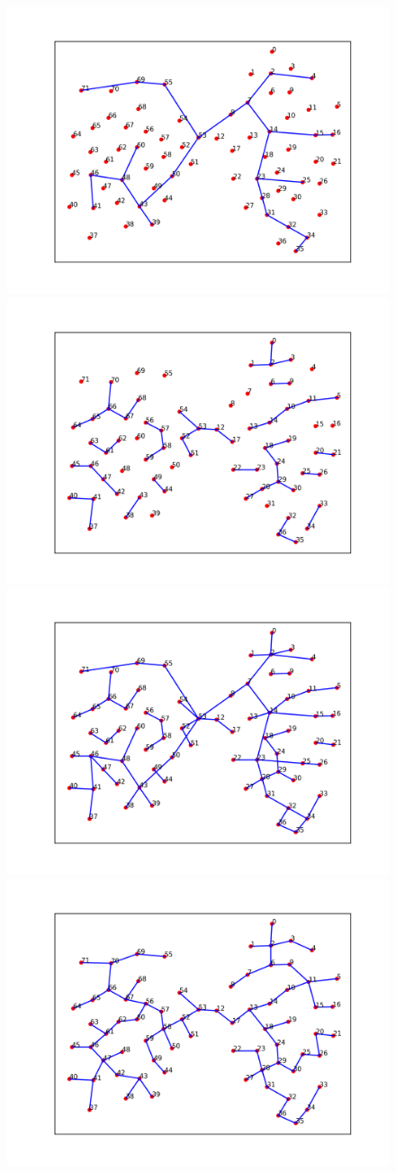 \documentclass[preprint,12pt]{elsarticle}
\begin{document}
  \begin{figure}[htb]
	\centering
	\includegraphics[width=0.45\linewidth]{step1.png}\hspace{-5.6ex}
	\includegraphics[width=0.45\linewidth]{step2.png}
	\includegraphics[width=0.45\linewidth]{step3.png}\hspace{-5.6ex}
	\includegraphics[width=0.45\linewidth]{step4.png}
  \end{figure}
\end{document}
